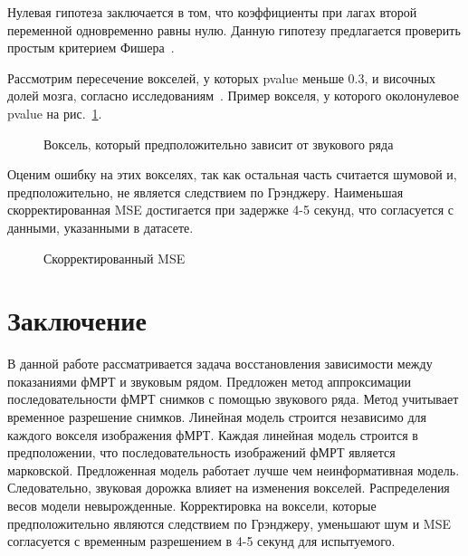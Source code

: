 \documentclass[12pt, twoside]{article}
\begin{document}
Нулевая гипотеза заключается в том, что коэффициенты при лагах второй переменной одновременно равны нулю. Данную гипотезу предлагается проверить простым критерием Фишера~\citep{hetero}.

Рассмотрим пересечение вокселей, у которых pvalue меньше 0.3, и височных долей мозга, согласно исследованиям~\citep{brain}. Пример вокселя, у которого околонулевое pvalue на рис.~\ref{fig:voxel}.

\begin{figure}[h!]
	\caption{Воксель, который предположительно зависит от звукового ряда}
	\label{fig:voxel}
\end{figure}


Оценим ошибку на этих вокселях, так как остальная часть считается шумовой и, предположительно, не является следствием по Грэнджеру. Наименьшая скорректированная MSE достигается при задержке 4-5 секунд, что согласуется с данными, указанными в датасете.

\begin{figure}[h!]
	\caption{Скорректированный MSE}
	\label{fig:loc}
\end{figure}

\section{Заключение}
В данной работе рассматривается задача восстановления зависимости между показаниями фМРТ и звуковым рядом. Предложен метод аппроксимации последовательности фМРТ снимков с помощью звукового ряда. Метод учитывает временное разрешение снимков. Линейная модель строится независимо для каждого вокселя изображения фМРТ. Каждая линейная модель строится в предположении, что последовательность изображений фМРТ является марковской. Предложенная модель работает лучше чем неинформативная модель. Следовательно, звуковая дорожка влияет на изменения вокселей. Распределения весов модели невырожденные. Корректировка на воксели, которые предположительно являются следствием по Грэнджеру, уменьшают шум и MSE согласуется с временным разрешением в 4-5 секунд для испытуемого.
\renewcommand{\refname}{Литература}
\makeatletter
\renewcommand{\bibsection}{%
   \section{\refname%
            \@mkboth{\MakeUppercase{\refname}}{\MakeUppercase{\refname}}%
   }
}


\end{document}
